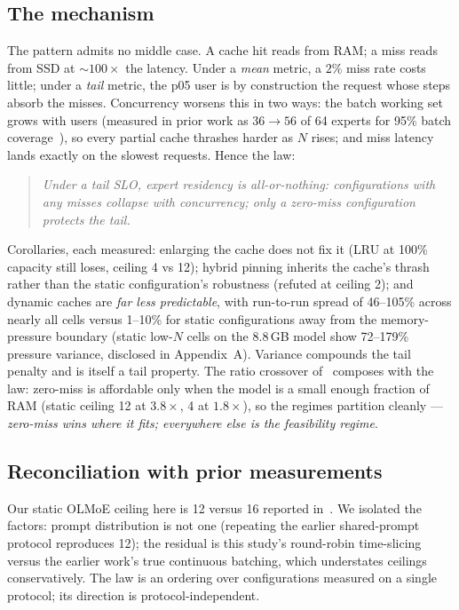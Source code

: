 \documentclass[11pt]{article}
\newcommand{\ppl}{\ensuremath{\times}}
\begin{document}
\subsection{The mechanism}

The pattern admits no middle case. A cache hit reads from RAM; a miss reads
from SSD at ${\sim}100\ppl$ the latency. Under a \emph{mean} metric, a $2\%$
miss rate costs little; under a \emph{tail} metric, the p05 user is by
construction the request whose steps absorb the misses. Concurrency worsens
this in two ways: the batch working set grows with users (measured in prior
work as $36\to56$ of 64 experts for 95\% batch
coverage~\cite{hariri2026pinning}), so every partial cache thrashes harder
as $N$ rises; and miss latency lands exactly on the slowest requests. Hence
the law:

\begin{quote}
\emph{Under a tail SLO, expert residency is all-or-nothing: configurations
with any misses collapse with concurrency; only a zero-miss configuration
protects the tail.}
\end{quote}

Corollaries, each measured: enlarging the cache does not fix it (LRU at
100\% capacity still loses, ceiling 4 vs 12); hybrid pinning inherits the
cache's thrash rather than the static configuration's robustness (refuted
at ceiling 2); and dynamic caches are \emph{far less predictable}, with
run-to-run spread of 46--105\% across nearly all cells versus 1--10\% for
static configurations away from the memory-pressure boundary (static low-$N$
cells on the 8.8\,GB model show 72--179\% pressure variance, disclosed in
Appendix~A). Variance compounds the tail penalty and is itself a tail
property. The ratio crossover of~\cite{hariri2026pinning} composes with the
law: zero-miss is affordable only when the model is a small enough fraction
of RAM (static ceiling 12 at $3.8\ppl$, 4 at $1.8\ppl$), so the regimes
partition cleanly --- \emph{zero-miss wins where it fits; everywhere else is
the feasibility regime}.

\subsection{Reconciliation with prior measurements}
\label{sec:reconciliation}
Our static OLMoE ceiling here is 12 versus 16 reported
in~\cite{hariri2026pinning}. We isolated the factors: prompt distribution
is not one (repeating the earlier shared-prompt protocol reproduces 12);
the residual is this study's round-robin time-slicing versus the earlier
work's true continuous batching, which understates ceilings conservatively.
The law is an ordering over configurations measured on a single protocol;
its direction is protocol-independent.
\end{document}
